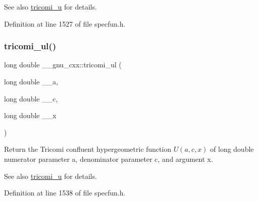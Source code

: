 \begin{DoxySeeAlso}{See also}
\hyperlink{group__mathsf__gnu_gaf51a13fad85006e4d65c5b117e49f7d8}{tricomi\+\_\+u} for details. 
\end{DoxySeeAlso}


Definition at line 1527 of file specfun.\+h.

\mbox{\label{group__mathsf__gnu_gac5213af3913aeb8beb7206688889c60c}} 
\subsubsection{\texorpdfstring{tricomi\+\_\+ul()}{tricomi\_ul()}}
{\footnotesize\ttfamily long double \+\_\+\+\_\+gnu\+\_\+cxx\+::tricomi\+\_\+ul (\begin{DoxyParamCaption}\item[{long double}]{\+\_\+\+\_\+a,  }\item[{long double}]{\+\_\+\+\_\+c,  }\item[{long double}]{\+\_\+\+\_\+x }\end{DoxyParamCaption})\hspace{0.3cm}{\ttfamily [inline]}}

Return the Tricomi confluent hypergeometric function $ U(a,c,x) $ of {\ttfamily long double} numerator parameter {\ttfamily a}, denominator parameter {\ttfamily c}, and argument {\ttfamily x}.

\begin{DoxySeeAlso}{See also}
\hyperlink{group__mathsf__gnu_gaf51a13fad85006e4d65c5b117e49f7d8}{tricomi\+\_\+u} for details. 
\end{DoxySeeAlso}


Definition at line 1538 of file specfun.\+h.

\mbox{\label{group__mathsf__gnu_ga9afb3065fea6ef3a91126d67f726f7af}} 

